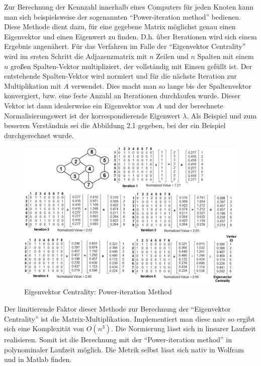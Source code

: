 \documentclass[a4paper,12pt,ngerman,chapterprefix=false,listof=totoc,bibliography=totoc]{scrreprt}
\begin{document}
{Zur Berechnung der Kennzahl innerhalb eines Computers für jeden Knoten kann man sich beispielsweise der sogenannten "`Power-iteration method"' bedienen. Diese Methode dient dazu, für eine gegebene Matrix möglichst genau einen Eigenvektor und einen Eigenwert zu finden. D.h. über Iterationen wird sich einem Ergebnis angenähert. Für das Verfahren im Falle der "`Eigenvektor Centrality"' wird im ersten Schritt die Adjazenzmatrix mit \(n\) Zeilen und \(n\) Spalten mit einem \(n\) großen Spalten-Vektor multipliziert, der vollständig mit Einsen gefüllt ist. Der entstehende Spalten-Vektor wird normiert und für die nächste Iteration zur Multiplikation mit \(A\) verwendet. Dies macht man so lange bis der Spaltenvektor konvergiert, bzw. eine feste Anzahl an Iterationen durchlaufen wurde. Dieser Vektor ist dann idealerweise ein Eigenvektor von \(A\) und der berechnete Normalisierungswert ist der korrespondierende Eigenwert \(\lambda\). Als Beispiel und zum besseren Verständnis sei die Abbildung 2.1 gegeben, bei der ein Beispiel durchgerechnet wurde. \cite{meghanathan_use_2015}
\begin{figure}[ht!]
	\centering
	\includegraphics[scale=.32]{Abbildungen/eigenvektor_centrality_example.png}
	\caption[Eigenvektor Centrality: Power-iteration Method \cite{meghanathan_use_2015}]{Eigenvektor Centrality: Power-iteration Method \cite{meghanathan_use_2015}}
\end{figure}
Der limitierende Faktor dieser Methode zur Berechnung der "`Eigenvektor Centrality"' ist die Matrix-Multiplikation. Implementiert man diese naiv so ergibt sich eine Komplexität von \(O(n^3)\). Die Normierung lässt sich in linearer Laufzeit realisieren. Somit ist die Berechnung mit der "`Power-iteration method"' in polynominaler Laufzeit möglich. Die Metrik selbst lässt sich nativ in Wolfram und in Matlab finden. \cite{wolfram_graph_2020,matlab_measure_2020}
}
\end{document}
